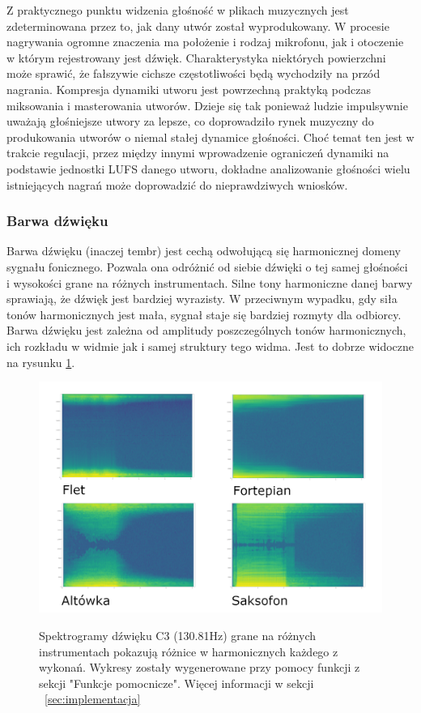 \documentclass[12pt,a4paper,twoside]{mwart}
\begin{document}
Z praktycznego punktu widzenia głośność w plikach muzycznych jest zdeterminowana przez to, jak dany utwór został wyprodukowany. W procesie nagrywania ogromne znaczenia ma położenie i rodzaj mikrofonu, jak i otoczenie w którym rejestrowany jest dźwięk. Charakterystyka niektórych powierzchni może sprawić, że fałszywie cichsze częstotliwości będą wychodziły na przód nagrania. Kompresja dynamiki utworu jest powrzechną praktyką podczas miksowania i masterowania utworów. Dzieje się tak ponieważ ludzie impulsywnie uważają głośniejsze utwory za lepsze, co doprowadziło rynek muzyczny do produkowania utworów o niemal stałej dynamice głośności. Choć temat ten jest w trakcie regulacji, przez między innymi wprowadzenie ograniczeń dynamiki na podstawie jednostki LUFS danego utworu, dokładne analizowanie głośności wielu istniejących nagrań może doprowadzić do nieprawdziwych wniosków.

\subsubsection{Barwa dźwięku}
Barwa dźwięku (inaczej tembr) jest cechą odwołującą się harmonicznej domeny sygnału fonicznego. Pozwala ona odróżnić od siebie dźwięki o tej samej głośności i wysokości grane na różnych instrumentach. Silne tony harmoniczne danej barwy sprawiają, że dźwięk jest bardziej wyrazisty. W przeciwnym wypadku, gdy siła tonów harmonicznych jest mała, sygnał staje się bardziej rozmyty dla odbiorcy. Barwa dźwięku jest zależna od amplitudy poszczególnych tonów harmonicznych, ich rozkładu w widmie jak i samej struktury tego widma. Jest to dobrze widoczne na rysunku \ref{fig:spektrogram}.

\begin{figure}[t]
  \begin{center}
  \includegraphics[scale=1.35]{images/spectogram_instruments.png}\\
  \caption{Spektrogramy dźwięku C3 (130.81Hz) grane na różnych instrumentach pokazują różnice w harmonicznych każdego z wykonań. Wykresy zostały wygenerowane przy pomocy funkcji z sekcji "Funkcje pomocnicze". Więcej informacji w sekcji ~\ref{sec:implementacja}}
  \label{fig:spektrogram}
  \end{center}
\end{figure}
\end{document}
